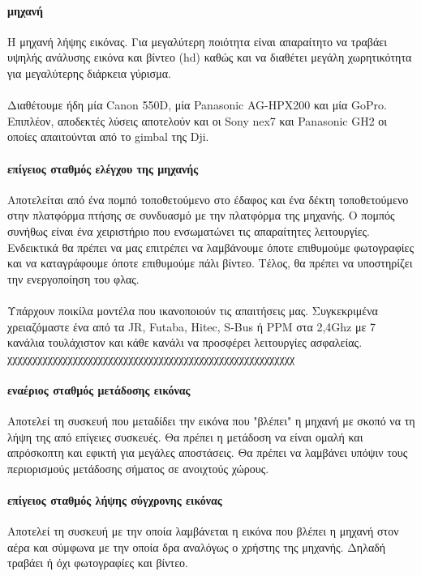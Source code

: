 \documentclass[a4paper, 12pt, twoside]{report}
\begin{document}
{{{{{{			\paragraph{μηχανή}{Η μηχανή λήψης εικόνας. Για μεγαλύτερη ποιότητα είναι απαραίτητο να τραβάει υψηλής ανάλυσης εικόνα και βίντεο (hd) καθώς και να διαθέτει μεγάλη χωρητικότητα για μεγαλύτερης διάρκεια γύρισμα.
			}
			\paragraph{}{Διαθέτουμε ήδη μία Canon 550D, μία Panasonic AG-HPX200 και μία GoPro. Επιπλέον, αποδεκτές λύσεις αποτελούν και οι Sony nex7 και Panasonic GH2 οι οποίες απαιτούνται από το gimbal της Dji.
			}
			
			\paragraph{επίγειος σταθμός ελέγχου της μηχανής}{Αποτελείται από ένα πομπό τοποθετούμενο στο έδαφος και ένα δέκτη τοποθετούμενο στην πλατφόρμα πτήσης σε συνδυασμό με την πλατφόρμα της μηχανής. Ο πομπός συνήθως είναι ένα χειριστήριο που ενσωματώνει τις απαραίτητες λειτουργίες. Ενδεικτικά θα πρέπει να μας επιτρέπει να λαμβάνουμε όποτε επιθυμούμε φωτογραφίες και να καταγράφουμε όποτε επιθυμούμε πάλι βίντεο. Τέλος, θα πρέπει να υποστηρίζει την ενεργοποίηση του φλας.
			}
			\paragraph{}{Υπάρχουν ποικίλα μοντέλα που ικανοποιούν τις απαιτήσεις μας. Συγκεκριμένα χρειαζόμαστε ένα από τα JR, Futaba, Hitec, S-Bus ή PPM στα 2,4Ghz με 7 κανάλια τουλάχιστον και κάθε κανάλι να προσφέρει λειτουργίες ασφαλείας.\linebreak
χχχχχχχχχχχχχχχχχχχχχχχχχχχχχχχχχχχχχχχχχχχχχχχχχχχχχχχχχ
			}
			
			\paragraph{εναέριος σταθμός μετάδοσης εικόνας}{Αποτελεί τη συσκευή που μεταδίδει την εικόνα που "βλέπει" η μηχανή με σκοπό να τη λήψη της από επίγειες συσκευές. Θα πρέπει η μετάδοση να είναι ομαλή και απρόσκοπτη και εφικτή για μεγάλες αποστάσεις. Θα πρέπει να λαμβάνει υπόψιν τους περιορισμούς μετάδοσης σήματος σε ανοιχτούς χώρους.
			}
			
			
			\paragraph{επίγειος σταθμός λήψης σύγχρονης εικόνας}{Αποτελεί τη συσκευή με την οποία λαμβάνεται η εικόνα που βλέπει η μηχανή στον αέρα και σύμφωνα με την οποία δρα αναλόγως ο χρήστης της μηχανής. Δηλαδή τραβάει ή όχι φωτογραφίες και βίντεο.
			}
}}}}}}
\end{document}

